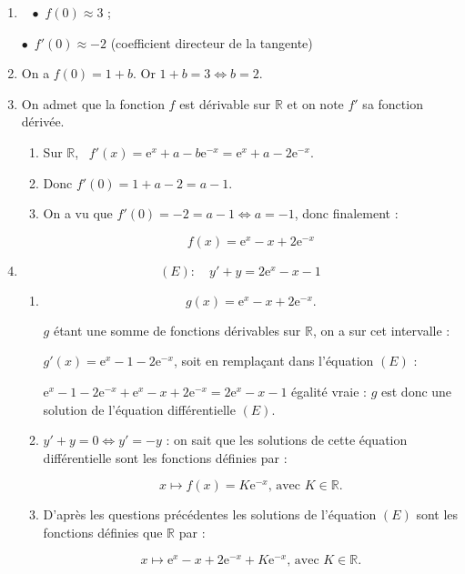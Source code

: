 \documentclass[10pt]{article}
\providecommand{\starredbullet}{\ensuremath{\bullet}}
\providecommand{\R}{\mathbb{R}}
\providecommand{\e}{{\mathrm{e}}}
\begin{document}
\begin{enumerate}
\item ~
\starredbullet~$f(0) \approx 3$ ;

\starredbullet~$f'(0) \approx - 2$ (coefficient directeur de la tangente)
\item 
On a $f(0) = 1 + b$. Or $1 + b = 3 \iff b = 2$.
\item On admet que la fonction $f$ est dérivable sur $\R$ et on note $f'$ sa fonction dérivée. 
	\begin{enumerate}
		\item 
Sur $\R$, \, $f'(x) = \e^x + a - b\e^{-x} = \e^x + a - 2\e^{-x}$.
		\item 
Donc $f'(0) = 1 + a - 2 = a - 1$.
		\item 
		On a vu que $f'(0) = - 2 = a - 1 \iff a = - 1$, donc finalement :
		
		\[f(x) = \e^x - x + 2\e^{-x}\]
	\end{enumerate}
\item 

\[(E) : \quad  y' + y = 2\e^x - x - 1\]

	\begin{enumerate}
		\item 
		
\[g(x) = \e^x - x + 2\e^{-x}.\]

$g$ étant une somme de fonctions dérivables sur $\R$, on a sur cet intervalle :

$g'(x) = \e^x - 1 - 2\e^{-x}$, soit en remplaçant dans l'équation $(E)$ :

$\e^x - 1 - 2\e^{-x} + \e^x - x + 2\e^{-x} = 2\e^x - x - 1$ égalité vraie : $g$ est donc une solution de l'équation différentielle $(E)$.


		\item 
$y' + y = 0 \iff y' = - y$ : on sait que les solutions de cette équation différentielle sont les fonctions définies par :

\[ x \longmapsto f(x) = K \e^{- x},\, \text{avec } K \in \R.\]

		\item 
D'après les questions précédentes les solutions de l'équation $(E)$ sont les fonctions définies que $\R$ par :

\[ x \longmapsto \e^x - x + 2\e^{-x} + K \e^{- x},\, \text{avec } K \in \R.\]
	\end{enumerate}
\end{enumerate}

\bigskip
\end{document}

